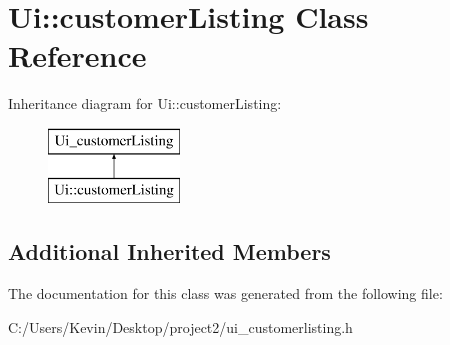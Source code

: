\hypertarget{class_ui_1_1customer_listing}{}\section{Ui\+:\+:customer\+Listing Class Reference}
\label{class_ui_1_1customer_listing}
Inheritance diagram for Ui\+:\+:customer\+Listing\+:\begin{figure}[H]
\begin{center}
\leavevmode
\includegraphics[height=2.000000cm]{class_ui_1_1customer_listing}
\end{center}
\end{figure}
\subsection*{Additional Inherited Members}


The documentation for this class was generated from the following file\+:\begin{DoxyCompactItemize}
\item 
C\+:/\+Users/\+Kevin/\+Desktop/project2/ui\+\_\+customerlisting.\+h\end{DoxyCompactItemize}

